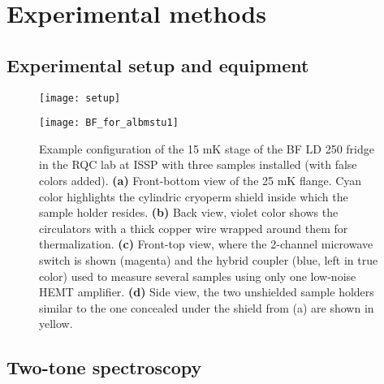 \documentclass[12pt, twoside]{report}
\numberwithin{equation}{section}
\begin{document}
\chapter{Experimental methods}

\section{Experimental setup and equipment}

\begin{figure}[h]
\centering
\texttt{[image: setup]}
\caption{}
\end{figure}



\begin{figure}[h]
\centering
\texttt{[image: BF\_for\_albmstu1]}
\caption{Example configuration of the 15 mK stage of the BF LD 250 fridge in the RQC lab at ISSP with three samples installed (with false colors added). \textbf{(a)} Front-bottom view of the 25 mK flange. Cyan color highlights the cylindric cryoperm shield inside which the sample holder resides. \textbf{(b)} Back view, violet color shows the circulators with  a thick copper wire wrapped around them for thermalization. \textbf{(c)} Front-top view, where the 2-channel  microwave switch is shown (magenta) and the hybrid coupler (blue, left in true color) used to measure several samples using only one low-noise HEMT amplifier. \textbf{(d)} Side view, the two unshielded sample holders similar to the one concealed under the shield from (a) are shown in yellow.}
\end{figure}

\section{Two-tone spectroscopy}
\end{document}

